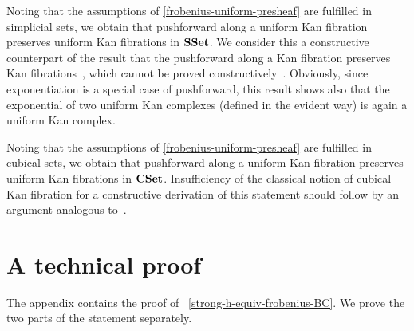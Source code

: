 \documentclass[reqno,10pt,a4paper,oneside,draft]{amsart}
\begin{document}
\begin{example}
Noting that the assumptions of \cref{frobenius-uniform-presheaf} are fulfilled in simplicial sets, we obtain that pushforward along a uniform Kan fibration preserves uniform Kan fibrations in $\mathbf{SSet}$.
We consider this a constructive counterpart of the result that the pushforward along a Kan fibration preserves Kan fibrations~\cite{voevodsky-simplicial-model}, which cannot be proved constructively~\cite{coquand-non-constructivity-kan}.
Obviously, since exponentiation is a special case of pushforward, this result shows also that the exponential of two uniform Kan complexes (defined in the evident way) is again a uniform Kan complex.
\end{example}

\begin{example}
Noting that the assumptions of \cref{frobenius-uniform-presheaf} are fulfilled in cubical sets, we obtain that pushforward along a uniform Kan fibration preserves uniform Kan fibrations in $\mathbf{CSet}$.
Insufficiency of the classical notion of cubical Kan fibration for a constructive derivation of this statement should follow by an argument analogous to~\cite{coquand-non-constructivity-kan}.
\end{example}


\appendix

\section{A technical proof}
\label{app:tecp}

The appendix contains the proof of ~\cref{strong-h-equiv-frobenius-BC}.
We prove the two parts of the statement separately.
\end{document}
